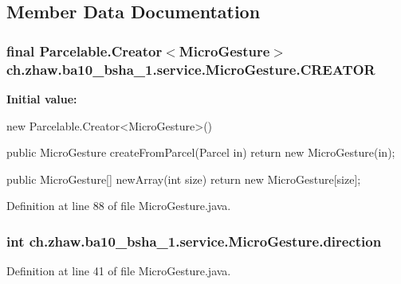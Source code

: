 \subsection{Member Data Documentation}
\hypertarget{classch_1_1zhaw_1_1ba10__bsha__1_1_1service_1_1MicroGesture_a017ccacff6d5f99fd9ee14943767feab}{
\subsubsection[{CREATOR}]{\setlength{\rightskip}{0pt plus 5cm}final Parcelable.Creator$<${\bf MicroGesture}$>$ {\bf ch.zhaw.ba10\_\-bsha\_\-1.service.MicroGesture.CREATOR}}}
\label{classch_1_1zhaw_1_1ba10__bsha__1_1_1service_1_1MicroGesture_a017ccacff6d5f99fd9ee14943767feab}
{\bfseries Initial value:}
\begin{DoxyCode}
 new Parcelable.Creator<MicroGesture>() {
                public MicroGesture createFromParcel(Parcel in) {
                        return new MicroGesture(in);
                }

                public MicroGesture[] newArray(int size) {
                        return new MicroGesture[size];
                }
        }
\end{DoxyCode}


Definition at line 88 of file MicroGesture.java.\hypertarget{classch_1_1zhaw_1_1ba10__bsha__1_1_1service_1_1MicroGesture_af599becac7054d4356b17da8eee187b0}{
\subsubsection[{direction}]{\setlength{\rightskip}{0pt plus 5cm}int {\bf ch.zhaw.ba10\_\-bsha\_\-1.service.MicroGesture.direction}}}
\label{classch_1_1zhaw_1_1ba10__bsha__1_1_1service_1_1MicroGesture_af599becac7054d4356b17da8eee187b0}


Definition at line 41 of file MicroGesture.java.

